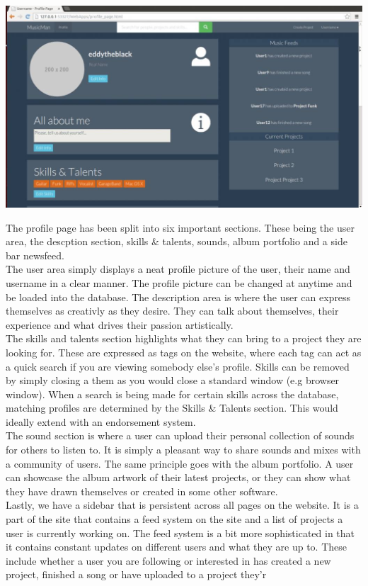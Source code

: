 \documentclass{article}
\begin{document}
\includegraphics[width=180mm]{3.jpg}

The profile page has been split into six important sections. These being the user area, the descption section, skills \& talents, sounds, album portfolio and a side bar newsfeed. \\ 

The user area simply displays a neat profile picture of the user, their name and username in a clear manner. The profile picture can be changed at anytime and be loaded into the database. The description area is where the user can express themselves as creativly as they desire. They can talk about themselves, their experience and what drives their passion artistically.\\

The skills and talents section highlights what they can bring to a project they are looking for. These are expressed as tags on the website, where each tag can act as a quick search if you are viewing somebody else's profile. Skills can be removed by simply closing a them as you would close a standard window (e.g browser window). When a search is being made for certain skills across the database, matching profiles are determined by the Skills \& Talents section. This would ideally extend with an endorsement system.\\ 

The sound section is where a user can upload their personal collection of sounds for others to listen to. It is simply a pleasant way to share sounds and mixes with a community of users. The same principle goes with the album portfolio. A user can showcase the album artwork of their latest projects, or they can show what they have drawn themselves or created in some other software. \\

Lastly, we have a sidebar that is persistent across all pages on the website. It is a part of the site that contains a feed system on the site and a list of projects a user is currently working on. The feed system is a bit more sophisticated in that it contains constant updates on different users and what they are up to. These include whether a user you are following or interested in has created a new project, finished a song or have uploaded to a project they'r 
\end{document}

